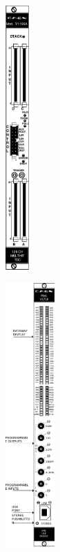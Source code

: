    \begin{figure}[H]
    \hspace{-15mm}
        \begin{subfigure}{0.1\linewidth}
		    \centering
			\includegraphics[height = 10cm]{fig/app1/V1190A-front.pdf}
			\caption{\label{fig:DAQSetup:A}}
		\end{subfigure}
		\begin{subfigure}{0.25\linewidth}
		    \centering
			\includegraphics[height = 10cm]{fig/app1/V1718-front.pdf}
			\caption{\label{fig:DAQSetup:B}}
		\end{subfigure}
		\begin{subfigure}{0.65\linewidth}
		    \centering

\end{subfigure}
\end{figure}
